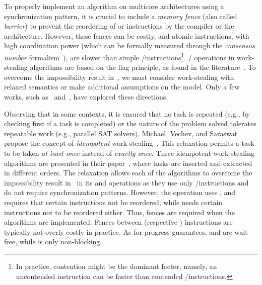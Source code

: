 To properly implement an algorithm on multicore architectures using a synchronization pattern, it is crucial to include a \emph{memory fence} (also called \emph{barrier}) to prevent the reordering of \R or \W instructions by the compiler or the architecture. However, these fences can be costly, and atomic \RMW{} instructions, with high coordination power (which can be formally measured through the \emph{consensus number} formalism~\cite{DBLP_journals_toplas_Herlihy91}), are slower than simple \R/\W instructions\footnote{In practice, contention might be the dominant factor, namely, an uncontended \RMW{} instruction can be faster than contended \R/\W instructions.}. \Take/\Steal{} operations in work-stealing algorithms are based on the flag principle, as found in the literature~\cite{circular.work.stealing, DBLP_conf_pldi_FrigoLR98, non.blocking.work.stealing, 10.1145.571825.571876}. To overcome the impossibility result in~\cite{DBLP_conf_popl_AttiyaGHKMV11}, we must consider work-stealing with relaxed semantics or make additional assumptions on the model. Only a few works, such as~\cite{maged.vechev.2009} and~\cite{fencefreework}, have explored these directions.

Observing that in some contexts, it is ensured that no task is repeated (e.g., by checking first if a task is completed) or the nature of the problem solved tolerates repeatable work (e.g., parallel SAT solvers), Michael, Vechev, and Saraswat propose the concept of \emph{idempotent} work-stealing~\cite{maged.vechev.2009}. This relaxation permits a task to be taken \emph{at least once} instead of \emph{exactly once}. Three idempotent work-stealing algorithms are presented in their paper~\cite{maged.vechev.2009},  where tasks are inserted and extracted in different orders. The relaxation allows each of the algorithms to overcome the impossibility result in~\cite{DBLP_conf_popl_AttiyaGHKMV11} in its \Put{} and \Take{} operations as they use only \R/\W instructions and do not require \RAW{} synchronization patterns. However, the \Steal{} operation uses \CAS, and \Put{} requires that certain \W instructions not be reordered, while \Steal{} needs certain \R instructions not to be reordered either. Thus, fences are required when the algorithms are implemented. Fences between \R (respective \W) instructions are typically not overly costly in practice. As for progress guarantees, \Put{} and \Take{} are wait-free, while \Steal{} is only non-blocking.

